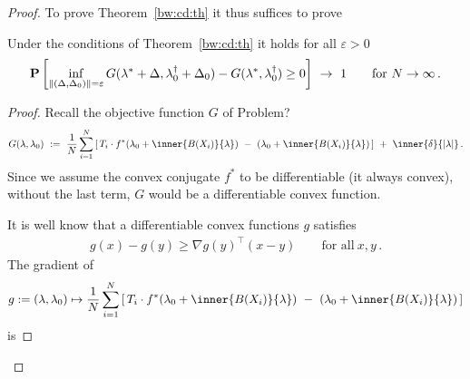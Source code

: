 \begin{proof}
 To prove Theorem~\ref{bw:cd:th}
 it thus suffices to prove
 \begin{lemma}
   Under the conditions of Theorem~\ref{bw:cd:th} it holds
   for all $\varepsilon>0$
\begin{gather}
   \P
   \left[ 
     \inf _ { 
       \norm{
         (
     \Delta
     ,
     \Delta_0
         )
 } 
= \varepsilon }
     G
     (
     \lambda^*
      +
      \Delta
      ,
      \lambda^\dagger_0
      +
     \Delta_0
     )
     -
     G
     (
     \lambda^*,
      \lambda^\dagger_0
     )
     \ge 
     0
   \right]
   \ 
   \to
   \ 
   1
   \qquad
   \text{for}
   \ 
   N\to\infty
   \,.
\end{gather}
 \end{lemma}
 \begin{proof}
  Recall the objective function $G$ of Problem? 
\begin{gather*}
  G(\lambda,\lambda_0)
  \ 
  :=
  \ 
    \frac{1}{N}
\sum_{i=1} 
  ^N
  \left[ 
    \,
  T_i
  \cdot
  f^*
  \!
  \left( 
\lambda_0
+
\inner
{B(X_i)}
{\lambda}
  \right)
  \ 
-
\ 
  \left( 
\lambda_0
+
\inner
{B(X_i)}
{\lambda}
  \right)
  \,
  \right]
  \ 
+
\ 
\inner
{\delta}
{|\lambda|}
\,.
\end{gather*}
   Since we assume the convex conjugate $f^*$ to be differentiable
   (it always convex),
without the last term, $G$ would be a differentiable convex function.

It is well know that a differentiable convex functions $g$ satisfies
  \begin{gather}
    g(x)-g(y)
    \ge
    \nabla
    g(y)^\top
    (x-y)
    \qquad 
    \text{for all}\ 
    x,y\,.
  \end{gather}
  The gradient of
  \begin{gather}
    g := 
    (\lambda,\lambda_0)
    \mapsto
    \frac{1}{N}
\sum_{i=1} 
  ^N
  \left[ 
    \,
  T_i
  \cdot
  f^*
  \!
  \left( 
\lambda_0
+
\inner
{B(X_i)}
{\lambda}
  \right)
  \ 
-
\ 
  \left( 
\lambda_0
+
\inner
{B(X_i)}
{\lambda}
  \right)
  \,
  \right]
  \end{gather}
  is 


\end{proof}
\end{proof}
